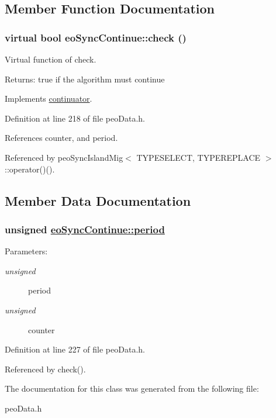 \subsection{Member Function Documentation}
\hypertarget{classeoSyncContinue_417078233f768debb14b5a90f6412b3c}{
\subsubsection[check]{\setlength{\rightskip}{0pt plus 5cm}virtual bool eo\-Sync\-Continue::check ()}}
\label{classeoSyncContinue_417078233f768debb14b5a90f6412b3c}


Virtual function of check. 

\begin{Desc}
\item[Returns:]true if the algorithm must continue \end{Desc}


Implements \hyperlink{classcontinuator_30601b037ab27b40610af1b979ec3d5b}{continuator}.

Definition at line 218 of file peo\-Data.h.

References counter, and period.

Referenced by peo\-Sync\-Island\-Mig$<$ TYPESELECT, TYPEREPLACE $>$::operator()().

\subsection{Member Data Documentation}
\hypertarget{classeoSyncContinue_966a94a44db2f84c7df0ef3d4694e37c}{
\subsubsection[period]{\setlength{\rightskip}{0pt plus 5cm}unsigned \hyperlink{classeoSyncContinue_966a94a44db2f84c7df0ef3d4694e37c}{eo\-Sync\-Continue::period}}}
\label{classeoSyncContinue_966a94a44db2f84c7df0ef3d4694e37c}


\begin{Desc}
\item[Parameters:]
\begin{description}
\item[{\em unsigned}]period \item[{\em unsigned}]counter \end{description}
\end{Desc}


Definition at line 227 of file peo\-Data.h.

Referenced by check().

The documentation for this class was generated from the following file:\begin{CompactItemize}
\item 
peo\-Data.h\end{CompactItemize}
